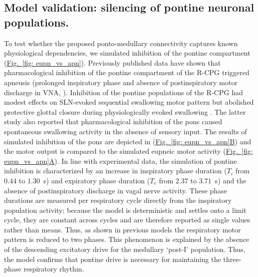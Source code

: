 \documentclass[pdflatex,sn-mathphys-ay]{sn-jnl}%
\renewcommand{\figureautorefname}{Fig.}
\newcommand{\Figref}[2][]{\hyperref[#2]{\figureautorefname~\ref*{#2}#1}}
\theoremstyle{thmstyleone}%
\theoremstyle{thmstyletwo}%
\theoremstyle{thmstylethree}%
\begin{document}
\subsection{Model validation: silencing of pontine neuronal populations.}
To test whether the proposed ponto-medullary connectivity captures known physiological dependencies, we simulated inhibition of the pontine compartment (\Figref[]{fig: eupn_vs_apn}).
Previously published data have shown that pharmacological inhibition of the pontine compartment of the R-CPG triggered apneusis (prolonged inspiratory phase and absence of postinspiratory motor discharge in VNA, \cite{dutschmann2006kolliker}). Inhibition of the pontine populations of the R-CPG had modest effects on SLN-evoked sequential swallowing motor pattern \citep{takemura2022effect} but abolished protective glottal closure during physiologically evoked swallowing \citep{bautista2014ponto}. The latter study also reported that pharmacological inhibition of the pons caused spontaneous swallowing activity in the absence of sensory input. The results of simulated inhibition of the pons are depicted in (\Figref[B]{fig: eupn_vs_apn}) and the motor output is compared to the simulated eupneic motor activity (\Figref[A]{fig: eupn_vs_apn}). In line with experimental data, the simulation of pontine inhibition is characterized by an increase in inspiratory phase duration ($T_i$ from $0.44$ to $1.30$~s) and expiratory phase duration ($T_e$ from $2.37$ to $3.71$~s) and the absence of postinspiratory discharge in vagal nerve activity. These phase durations are measured per respiratory cycle directly from the inspiratory population activity; because the model is deterministic and settles onto a limit cycle, they are constant across cycles and are therefore reported as single values rather than means. Thus, as shown in previous models \citep{smith2007spatial} the respiratory motor pattern is reduced to two phases. This phenomenon is explained by the absence of the descending excitatory drive for the medullary `post-I' population. Thus, the model confirms that pontine drive is necessary for maintaining the three-phase respiratory rhythm.
\end{document}
